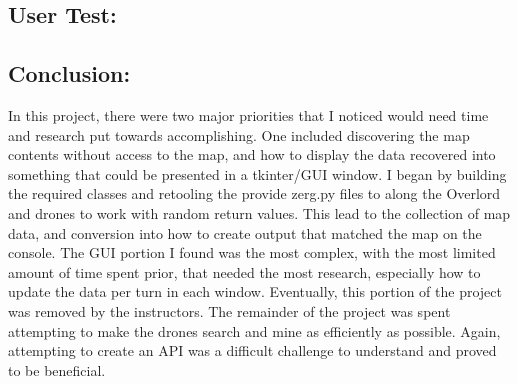 \documentclass{article}
\begin{document}
    \subsection{User Test:}

\subsection{Conclusion:}
        In this project, there were two major priorities that I noticed would need time and research put towards accomplishing. One included discovering the map contents without access to the map, and how to display the data recovered into something that could be presented in a tkinter/GUI window.  I began by building the required classes and retooling the provide zerg.py files to along the Overlord and drones to work with random return values. This lead to the collection of map data, and conversion into how to create output that matched the map on the console. The GUI portion I found was the most complex, with the most limited amount of time spent prior, that needed the most research, especially how to update the data per turn in each window.  Eventually, this portion of the project was removed by the instructors.  The remainder of the project was spent attempting to make the drones search and mine as efficiently as possible. Again, attempting to create an API was a difficult challenge to understand and proved to be beneficial. 
\end{document}
